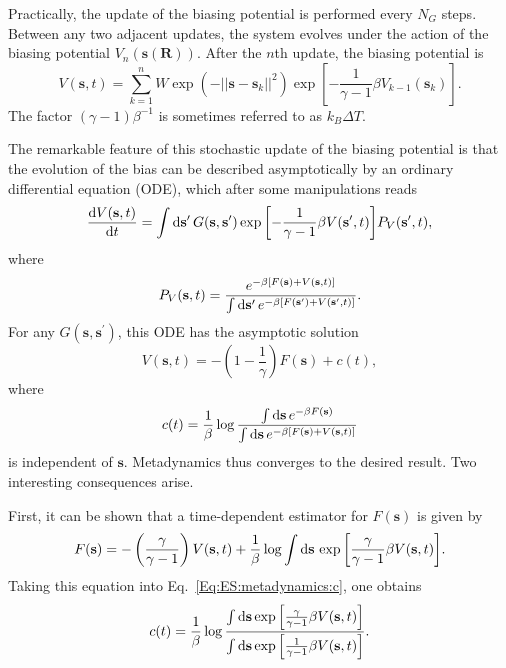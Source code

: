 Practically, the update of the biasing potential is performed every $N_G$ steps. Between any two adjacent updates, the system evolves under the action of the biasing potential $V_n(\mathbf{s}(\mathbf{R}))$. After the $n$th update, the biasing potential is
\begin{equation}
    V(\mathbf{s},t)=\sum_{k=1}^n W\exp{\left(-||\mathbf{s}-\mathbf{s}_k||^2\right)}\exp{\left[-\frac{1}{\gamma-1}\beta V_{k-1}(\mathbf{s}_k)\right]}.
\end{equation}
The factor $(\gamma-1)\beta^{-1}$ is sometimes referred to as $k_B\Delta T$.

The remarkable feature of this stochastic update of the biasing potential is that the evolution of the bias can be described asymptotically by an ordinary differential equation (ODE), which after some manipulations reads
\begin{equation}
    \frac{\mathop{}\!\mathrm{d} V(\mathbf{s},t)}{\mathop{}\!\mathrm{d} t}=\int \mathop{}\!\mathrm{d} \mathbf{s}^\prime\, G(\mathbf{s},\mathbf{s}^\prime)\exp{\left[-\frac{1}{\gamma-1}\beta V(\mathbf{s}^\prime,t)\right]}P_V(\mathbf{s}^\prime,t),
\end{equation}
where
\begin{equation}
    P_V(\mathbf{s},t)=\frac{e^{-\beta[F(\mathbf{s})+V(\mathbf{s},t)]}}{\int \mathop{}\!\mathrm{d} \mathbf{s}^\prime\, e^{-\beta[F(\mathbf{s}^\prime)+V(\mathbf{s}^\prime,t)]}}.
\end{equation}
For any $G(\mathbf{s},\mathbf{s}^\prime)$, this ODE has the asymptotic solution
\begin{equation}
    V(\mathbf{s},t)=-\left(1-\frac{1}{\gamma}\right)F(\mathbf{s})+c(t),
\end{equation}
where
\begin{equation}
    c(t)=\frac{1}{\beta}\log{\frac{\int \mathop{}\!\mathrm{d}\mathbf{s}\, e^{-\beta F(\mathbf{s})}}{\int \mathop{}\!\mathrm{d}\mathbf{s}\, e^{-\beta \left[F(\mathbf{s})+V(\mathbf{s},t)\right]}}}
    \label{Eq:ES:metadynamics:c}
\end{equation}
is independent of $\mathbf{s}$. Metadynamics thus converges to the desired result. Two interesting consequences arise.

First, it can be shown that a time-dependent estimator for $F(\mathbf{s})$ is given by
\begin{equation}
    F(\mathbf{s})=-\left(\frac{\gamma}{\gamma -1}\right)V(\mathbf{s},t)+\frac{1}{\beta}\log{\int \mathop{}\!\mathrm{d}\mathbf{s}\, \exp{\left[\frac{\gamma}{\gamma-1}\beta V(\mathbf{s},t)\right]}}.
\end{equation}
Taking this equation into Eq.~\ref{Eq:ES:metadynamics:c}, one obtains
\begin{equation}
    c(t)=\frac{1}{\beta}\log{\frac{\int \mathop{}\!\mathrm{d}\mathbf{s}\exp{\left[\frac{\gamma}{\gamma-1}\beta V(\mathbf{s},t)\right]}}{\int \mathop{}\!\mathrm{d}\mathbf{s}\exp{\left[\frac{1}{\gamma-1}\beta V(\mathbf{s},t)\right]}}}.
\end{equation}

